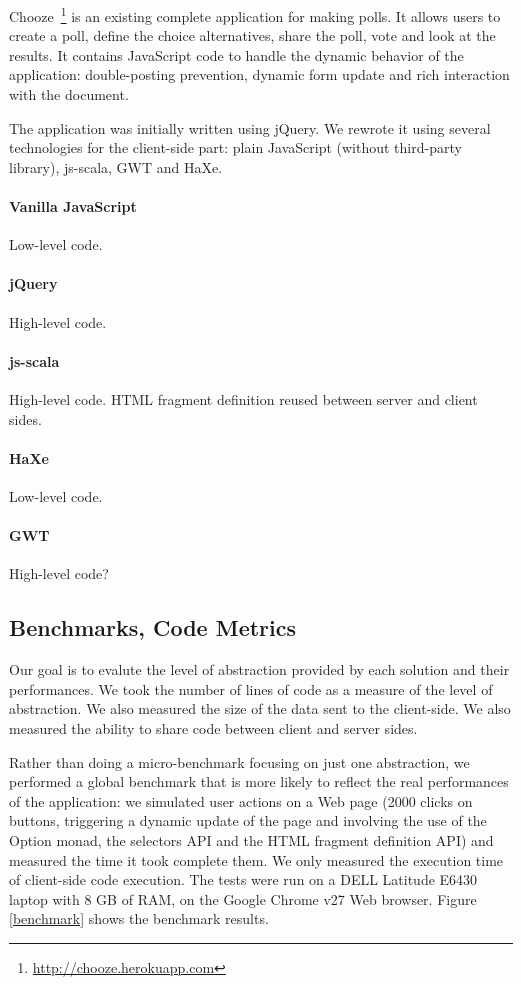 \documentclass[preprint]{sigplanconf}
\begin{document}
Chooze~\footnote{\href{http://chooze.herokuapp.com}{http://chooze.herokuapp.com}} is an existing complete
application for making polls. It allows users to create a poll, define the choice alternatives, share the poll, vote
and look at the results. It contains JavaScript code to handle the dynamic behavior of the application:
double-posting prevention, dynamic form update and rich interaction with the document.

The application was initially written using jQuery. We rewrote it using several technologies for the client-side
part: plain JavaScript (without third-party library), js-scala, GWT and HaXe.

\paragraph*{Vanilla JavaScript} Low-level code.

\paragraph*{jQuery} High-level code.

\paragraph*{js-scala} High-level code. HTML fragment definition reused between server and client sides.

\paragraph*{HaXe} Low-level code.

\paragraph*{GWT} High-level code?

\subsection{Benchmarks, Code Metrics}

Our goal is to evalute the level of abstraction provided by each solution and their performances. We took the
number of lines of code as a measure of the level of abstraction. We also measured the size of the data sent to the
client-side. We also measured the ability to share code between client and server sides.

Rather than doing a micro-benchmark focusing on just one abstraction, we performed a global benchmark that is more
likely to reflect the real performances of the application: we simulated user actions on a Web page (2000 clicks on
buttons, triggering a dynamic update of the page and involving the use of the Option monad, the selectors API and
the HTML fragment definition API) and measured the time it took complete them. We only measured the execution time of
client-side code execution. The tests were run on a DELL Latitude E6430 laptop with 8 GB of RAM, on the Google
Chrome v27 Web browser. Figure \ref{benchmark} shows the benchmark results.
\end{document}
